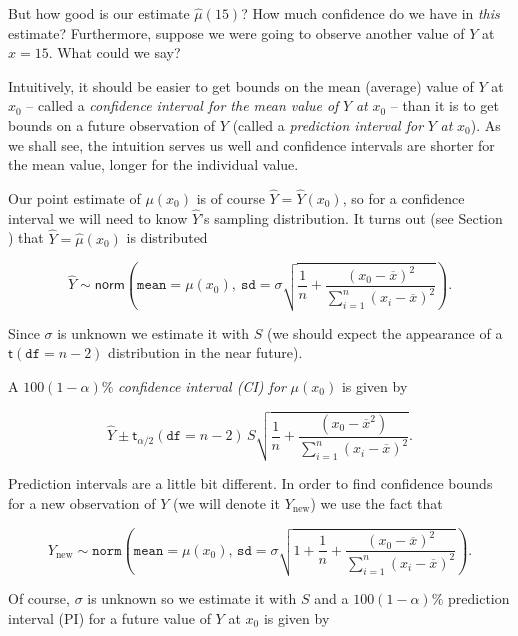 \documentclass[]{book}
\numberwithin{equation}{chapter}
\numberwithin{figure}{chapter}
\theoremstyle{plain}
\theoremstyle{definition}
\theoremstyle{remark}
\theoremstyle{definition}
\theoremstyle{definition}
\theoremstyle{remark}
\begin{document}
But how good is our estimate \(\hat{\mu}(15)\)? How much confidence do
we have in \emph{this} estimate? Furthermore, suppose we were going to
observe another value of \(Y\) at \(x=15\). What could we say?

Intuitively, it should be easier to get bounds on the mean (average)
value of \(Y\) at \(x_{0}\) -- called a \emph{confidence interval for
the mean value of} \(Y\) \emph{at} \(x_{0}\) -- than it is to get bounds
on a future observation of \(Y\) (called a \emph{prediction interval
for} \(Y\) \emph{at} \(x_{0}\)). As we shall see, the intuition serves
us well and confidence intervals are shorter for the mean value, longer
for the individual value.

Our point estimate of \(\mu(x_{0})\) is of course
\(\hat{Y}=\hat{Y}(x_{0})\), so for a confidence interval we will need to
know \(\hat{Y}\)'s sampling distribution. It turns out (see Section )
that \(\hat{Y}=\hat{\mu}(x_{0})\) is distributed

\begin{equation}
\hat{Y}\sim\mathsf{norm}\left(\mathtt{mean}=\mu(x_{0}),\:\mathtt{sd}=\sigma\sqrt{\frac{1}{n}+\frac{(x_{0}-\overline{x})^{2}}{\sum_{i=1}^{n}(x_{i}-\overline{x})^{2}}}\right).
\end{equation}

Since \(\sigma\) is unknown we estimate it with \(S\) (we should expect
the appearance of a \(\mathsf{t}(\mathtt{df}=n-2)\) distribution in the
near future).

A \(100(1-\alpha)\%\) \emph{confidence interval (CI) for} \(\mu(x_{0})\)
is given by

\begin{equation}
\label{eq-SLR-conf-int-formula}
\hat{Y}\pm\mathsf{t}_{\alpha/2}(\mathtt{df}=n-2)\, S\sqrt{\frac{1}{n}+\frac{(x_{0}-\overline{x}^{2})}{\sum_{i=1}^{n}(x_{i}-\overline{x})^{2}}}.
\end{equation}

Prediction intervals are a little bit different. In order to find
confidence bounds for a new observation of \(Y\) (we will denote it
\(Y_{\mbox{new}}\)) we use the fact that

\begin{equation}
Y_{\mbox{new}}\sim\mathtt{norm}\left(\mathtt{mean}=\mu(x_{0}),\,\mathtt{sd}=\sigma\sqrt{1+\frac{1}{n}+\frac{(x_{0}-\overline{x})^{2}}{\sum_{i=1}^{n}(x_{i}-\overline{x})^{2}}}\right).
\end{equation}

Of course, \(\sigma\) is unknown so we estimate it with \(S\) and a
\(100(1-\alpha)\%\) prediction interval (PI) for a future value of \(Y\)
at \(x_{0}\) is given by
\end{document}
